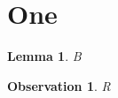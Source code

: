 \documentclass{article}
\begin{document}
\section{One}
\newtheorem{lemma}{Lemma}
\newtheorem{remark}{Observation}
\begin{lemma}B\end{lemma}
\begin{remark}R\end{remark}
\end{document}
